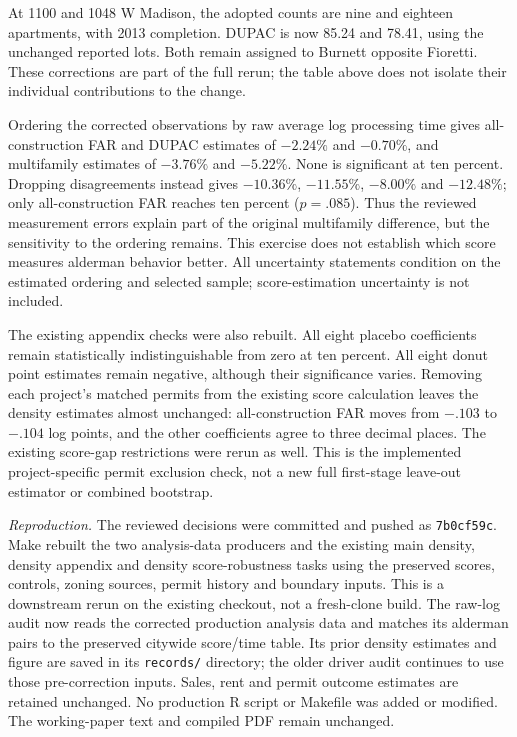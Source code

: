 At 1100 and 1048 W Madison, the adopted counts are nine and eighteen apartments,
with 2013 completion. DUPAC is now 85.24 and 78.41, using the unchanged reported
lots. Both remain assigned to Burnett opposite Fioretti. These corrections are
part of the full rerun; the table above does not isolate their individual
contributions to the change.

Ordering the corrected observations by raw average log processing time gives
all-construction FAR and DUPAC estimates of $-2.24\%$ and $-0.70\%$, and
multifamily estimates of $-3.76\%$ and $-5.22\%$. None is significant at ten
percent. Dropping disagreements instead gives $-10.36\%$, $-11.55\%$,
$-8.00\%$ and $-12.48\%$; only all-construction FAR reaches ten percent
($p=.085$). Thus the reviewed measurement errors explain part of the original
multifamily difference, but the sensitivity to the ordering remains. This
exercise does not establish which score measures alderman behavior better.
All uncertainty statements condition on the estimated ordering and selected
sample; score-estimation uncertainty is not included.

The existing appendix checks were also rebuilt. All eight placebo coefficients
remain statistically indistinguishable from zero at ten percent. All eight
donut point estimates remain negative, although their significance varies.
Removing each project's matched permits from the existing score calculation
leaves the density estimates almost unchanged: all-construction FAR moves from
$-.103$ to $-.104$ log points, and the other coefficients agree to three decimal
places. The existing score-gap restrictions were rerun as well. This is the
implemented project-specific permit exclusion check, not a new full first-stage
leave-out estimator or combined bootstrap.

\textit{Reproduction.} The reviewed decisions were committed and pushed as
\texttt{7b0cf59c}. Make rebuilt the two analysis-data producers and the existing
main density, density appendix and density score-robustness tasks using the
preserved scores, controls, zoning sources, permit history and boundary inputs.
This is a downstream rerun on the existing checkout, not a fresh-clone build.
The raw-log audit now reads the corrected production analysis data and matches
its alderman pairs to the preserved citywide score/time table. Its prior density
estimates and figure are saved in its \texttt{records/} directory; the older
driver audit continues to use those pre-correction inputs. Sales, rent and permit
outcome estimates are retained unchanged. No production R script or Makefile
was added or modified. The working-paper text and compiled PDF remain unchanged.

